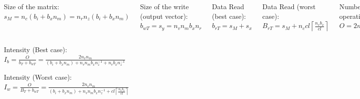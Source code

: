 \documentclass{beamer}
\newcommand{\ceil}[1]{\left\lceil#1\right\rceil}
\begin{document}
\begin{frame}
\begin{columns}
    Size of the matrix:\\$s_M = n_c (b_i + b_x n_m) = n_r n_z (b_i + b_x n_m)$

    Size of the write (output vector):\\$b_{wT} = s_y = n_v n_m b_x n_r$

    Data Read (best case):\\$b_{rT} = s_M + s_x$
    
    Data Read (worst case):\\$B_{rT} = s_M + n_c cl \ceil{\frac{n_vb_x}{cl}}$

    Number of floating point operation:\\$O = 2 n_v n_m n_c = 2 n_v n_m n_z n_r$
  \end{columns}

  \begin{center}
    Intensity (Best case):\\
    $I_b = \frac{O}{b_T+ b_{wT}} = \frac{2 n_v n_m}{ (b_i + b_x n_m) + n_v n_m b_x n_z^{-1} + n_v b_x n_z^{-1} }$
    
    Intensity (Worst case):\\
    $I_w = \frac{O}{B_T+ b_{wT}} = \frac{2 n_v n_m}{(b_i+b_x n_m) + n_v n_m b_x n_z^{-1} + cl \ceil{\frac{n_vb_x}{cl}} }$
  \end{center}
\end{frame}
\end{document}
